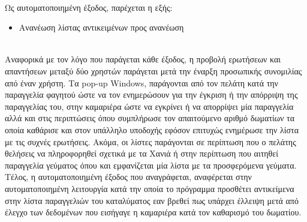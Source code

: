 \noindent \\ 
Ως αυτοματοποιημένη έξοδος, παρέχεται η εξής:
\begin{itemize}
	\item  Ανανέωση λίστας αντικειμένων προς ανανέωση
\end{itemize}

\begin{table}[H]
\end{table}
\clearpage

\noindent\\
Αναφορικά με τον λόγο που παράγεται κάθε έξοδος, η προβολή ερωτήσεων και απαντήσεων
μεταξύ δύο χρηστών παράγεται μετά την έναρξη προσωπικής συνομιλίας από έναν χρήστη. Τα pop-up
Windows, παράγονται από τον πελάτη κατά την παραγγελία φαγητού ώστε να τον ενημερώσουν για
την έγκριση ή την απόρριψη της παραγγελίας του, στην καμαριέρα ώστε να εγκρίνει ή να  απορρίψει 
μία παραγγελία αλλά και στις περιπτώσεις όπου συμπλήρωσε τον απαιτούμενο αριθμό δωματίων τα 
οποία καθάρισε και στον υπάλληλο υποδοχής εφόσον επιτυχώς ενημέρωσε την λίστα με τις 
συχνές ερωτήσεις. Ακόμα, οι λίστες παράγονται σε περίπτωση που ο πελάτης θελήσεις να πληροφορηθεί 
σχετικά με τα Χανιά  ή στην περίπτωση που αιτηθεί παραγγελία γεύματος όπου και εμφανίζεται μία λίστα
με τα προσφερόμενα γεύματα. Τέλος, η αυτοματοποιημένη έξοδος που αναγράφεται, αναφέρεται στην 
αυτοματοποιημένη λειτουργία κατά την οποία το πρόγραμμα προσθέτει αντικείμενα στην λίστα 
παραγγελιών  του καταλύματος εαν βρεθεί πως υπάρχει έλλειψη μετά από έλεγχο των δεδομένων που 
εισήγαγε η καμαριέρα κατά τον καθαρισμό του δωματίου.\\

